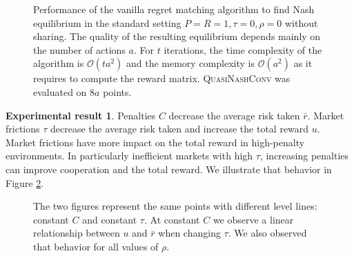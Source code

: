 \documentclass[preprint,12pt,authoryear,doubleblind]{elsarticle}
\theoremstyle{definition}
\newtheorem{result}[theorem]{Experimental result}
\begin{document}
\begin{figure}[htbp]
  \centering
  \begin{minipage}[t]{0.48\textwidth}
    \centering
    
  \end{minipage}
  \hfill
  \begin{minipage}[t]{0.48\textwidth}
    \centering
    
  \end{minipage}
  \caption{Performance of the vanilla regret matching algorithm to find Nash equilibrium in the standard setting $P=R=1, \tau=0, \rho=0$ without sharing. The quality of the resulting equilibrium depends mainly on the number of actions $a$. For $t$ iterations, the time complexity of the algorithm is $\mathcal{O}(t a^2)$ and the memory complexity is $\mathcal{O}(a^2)$ as it requires to compute the reward matrix. \textsc{QuasiNashConv} was evaluated on $8 a$ points.}
  \label{fig:rm-size}  
\end{figure}

\begin{result}

    Penalties $C$ decrease the average risk taken $\bar r$. Market frictions $\tau$ decrease the average risk taken and increase the total reward $u$. Market frictions have more impact on the total reward in high-penalty environments.
    In particularly inefficient markets with high $\tau$, increasing penalties can improve cooperation and the total reward. We illustrate that behavior in Figure \ref{fig:result-noise}.

\end{result}


\begin{figure}[htbp]
  \centering
  \begin{minipage}[t]{0.48\textwidth}
    \centering
    
  \end{minipage}
  \hfill
  \begin{minipage}[t]{0.48\textwidth}
    \centering
    
  \end{minipage}
  \caption{The two figures represent the same points with different level lines: constant $C$ and constant $\tau$. At constant $C$ we observe a linear relationship between $u$ and $\bar r$ when changing $\tau$. We also observed that behavior for all values of $\rho$.}
  \label{fig:result-noise}  
\end{figure}
\end{document}
